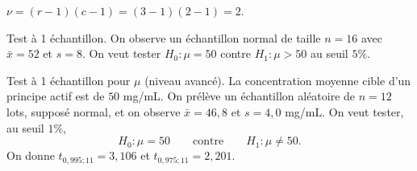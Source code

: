 \begin{questions}
\begin{parts}
\begin{checkboxes}
\end{checkboxes}
\begin{solution}
$\nu=(r-1)(c-1)=(3-1)(2-1)=2$.
\end{solution}
\end{parts}

\pageblanche
\question[8] Test à 1 échantillon.
On observe un échantillon normal de taille $n=16$ avec $\bar{x}=52$ et $s=8$.
On veut tester $H_0:\mu=50$ contre $H_1:\mu>50$ au seuil $5\%$.

\pageblanche
\question[10] Test à 1 échantillon pour $\mu$ (niveau avancé).
La concentration moyenne cible d'un principe actif est de $50$ mg/mL.
On prélève un échantillon aléatoire de $n=12$ lots, supposé normal, et on observe
$\bar{x}=46{,}8$ et $s=4{,}0$ mg/mL.
On veut tester, au seuil $1\%$,
\[
H_0:\mu=50\qquad\text{contre}\qquad H_1:\mu\neq 50.
\]
On donne $t_{0{,}995;11}=3{,}106$ et $t_{0{,}975;11}=2{,}201$.
\end{questions}
